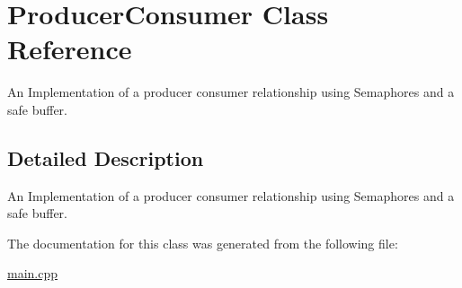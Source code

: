 \hypertarget{class_producer_consumer}{}\section{Producer\+Consumer Class Reference}
\label{class_producer_consumer}


An Implementation of a producer consumer relationship using Semaphores and a safe buffer.  




\subsection{Detailed Description}
An Implementation of a producer consumer relationship using Semaphores and a safe buffer. 

The documentation for this class was generated from the following file\+:\begin{DoxyCompactItemize}
\item 
\hyperlink{main_8cpp}{main.\+cpp}\end{DoxyCompactItemize}

